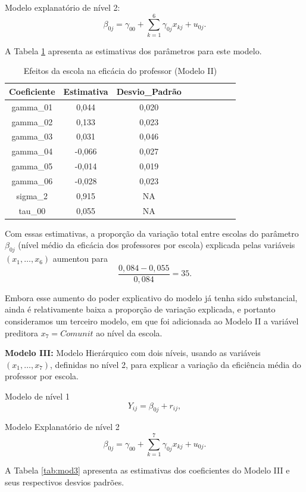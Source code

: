 \documentclass[]{book}
\theoremstyle{definition}
\theoremstyle{definition}
\theoremstyle{definition}
\theoremstyle{remark}
\begin{document}
Modelo explanatório de nível 2: \[
\beta _{0j}=\gamma _{00}+\sum\limits_{k=1}^{6}\gamma _{0j}x_{kj}+u_{0j}.
\]

A Tabela \ref{tab:mod2} apresenta as estimativas dos parâmetros para
este modelo.

\begin{table}

\caption{\label{tab:mod2}Efeitos da escola na eficácia do professor (Modelo II)}
\centering
\begin{tabular}[t]{ccccccccc}
\toprule
Coeficiente & Estimativa & Desvio\_Padrão\\
\midrule
gamma\_01 & 0,044 & 0,020\\
gamma\_02 & 0,133 & 0,023\\
gamma\_03 & 0,031 & 0,046\\
gamma\_04 & -0,066 & 0,027\\
gamma\_05 & -0,014 & 0,019\\
\addlinespace
gamma\_06 & -0,028 & 0,023\\
sigma\_2 & 0,915 & NA\\
tau\_00 & 0,055 & NA\\
\bottomrule
\end{tabular}
\end{table}

Com essas estimativas, a proporção da variação total entre escolas do
parâmetro \(\beta _{0j}\) (nível médio da eficácia dos professores por
escola) explicada pelas variáveis \(\left(x_{1},\ldots ,x_{6}\right)\)
aumentou para \[
\frac{0,084-0,055}{0,084}=35.
\]

Embora esse aumento do poder explicativo do modelo já tenha sido
substancial, ainda é relativamente baixa a proporção de variação
explicada, e portanto consideramos um terceiro modelo, em que foi
adicionada ao Modelo II a variável preditora \(x_{7}=Comunit\) ao nível
da escola.

\textbf{Modelo III:} Modelo Hierárquico com dois níveis, usando as
variáveis \(\left( x_{1},\ldots ,x_{7}\right)\), definidas no nível 2,
para explicar a variação da eficiência média do professor por escola.

Modelo de nível 1 \[
Y_{ij}=\beta _{0j}+r_{ij},
\]

Modelo Explanatório de nível 2 \[
\beta _{0j}=\gamma _{00}+\sum\limits_{k=1}^{7}\gamma _{0j}x_{kj}+u_{0j}.
\]

A Tabela \ref{tab:mod3} apresenta as estimativas dos coeficientes do
Modelo III e seus respectivos desvios padrões.
\end{document}
